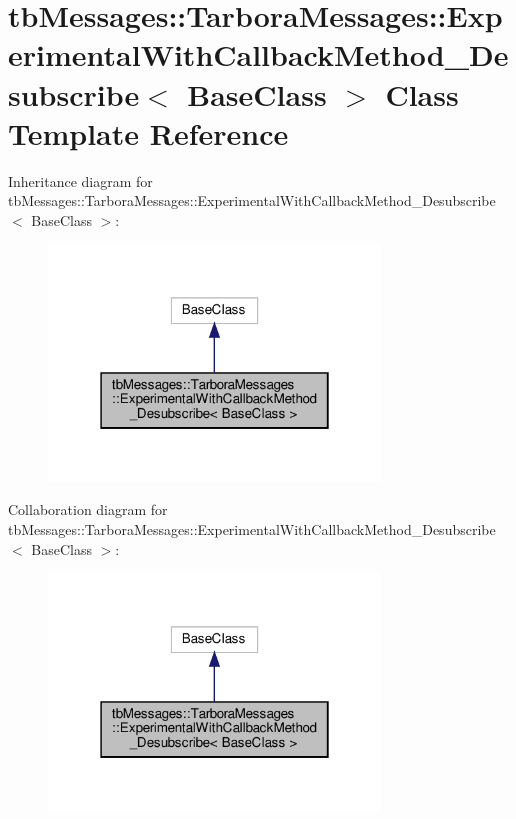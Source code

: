 \hypertarget{classtbMessages_1_1TarboraMessages_1_1ExperimentalWithCallbackMethod__Desubscribe}{}\section{tb\+Messages\+:\+:Tarbora\+Messages\+:\+:Experimental\+With\+Callback\+Method\+\_\+\+Desubscribe$<$ Base\+Class $>$ Class Template Reference}
\label{classtbMessages_1_1TarboraMessages_1_1ExperimentalWithCallbackMethod__Desubscribe}


Inheritance diagram for tb\+Messages\+:\+:Tarbora\+Messages\+:\+:Experimental\+With\+Callback\+Method\+\_\+\+Desubscribe$<$ Base\+Class $>$\+:
\nopagebreak
\begin{figure}[H]
\begin{center}
\leavevmode
\includegraphics[width=250pt]{classtbMessages_1_1TarboraMessages_1_1ExperimentalWithCallbackMethod__Desubscribe__inherit__graph}
\end{center}
\end{figure}


Collaboration diagram for tb\+Messages\+:\+:Tarbora\+Messages\+:\+:Experimental\+With\+Callback\+Method\+\_\+\+Desubscribe$<$ Base\+Class $>$\+:
\nopagebreak
\begin{figure}[H]
\begin{center}
\leavevmode
\includegraphics[width=250pt]{classtbMessages_1_1TarboraMessages_1_1ExperimentalWithCallbackMethod__Desubscribe__coll__graph}
\end{center}
\end{figure}
